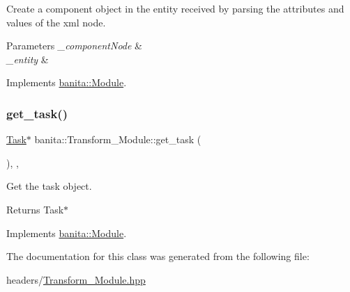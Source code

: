 Create a component object in the entity received by parsing the attributes and values of the xml node. 


\begin{DoxyParams}{Parameters}
{\em \+\_\+component\+Node} & \\
\hline
{\em \+\_\+entity} & \\
\hline
\end{DoxyParams}


Implements \mbox{\hyperlink{classbanita_1_1_module_ace6d7ce15d60044f233d30a43dc961dd}{banita\+::\+Module}}.

\mbox{\label{classbanita_1_1_transform___module_a6cee3919fd2b22f82c41f056ac87e546}} 
\subsubsection{\texorpdfstring{get\_task()}{get\_task()}}
{\footnotesize\ttfamily \mbox{\hyperlink{classbanita_1_1_task}{Task}}$\ast$ banita\+::\+Transform\+\_\+\+Module\+::get\+\_\+task (\begin{DoxyParamCaption}{ }\end{DoxyParamCaption})\hspace{0.3cm}{\ttfamily [inline]}, {\ttfamily [override]}, {\ttfamily [virtual]}}



Get the task object. 

\begin{DoxyReturn}{Returns}
Task$\ast$ 
\end{DoxyReturn}


Implements \mbox{\hyperlink{classbanita_1_1_module_a8e29c0b6d7e11a39dac3c0879ef513d9}{banita\+::\+Module}}.



The documentation for this class was generated from the following file\+:\begin{DoxyCompactItemize}
\item 
headers/\mbox{\hyperlink{_transform___module_8hpp}{Transform\+\_\+\+Module.\+hpp}}\end{DoxyCompactItemize}
